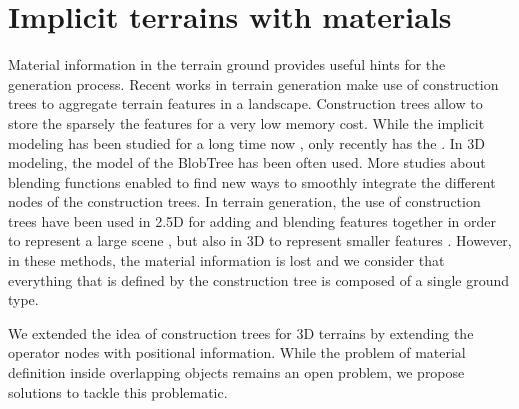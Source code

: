 
\section{Implicit terrains with materials}
\label{sec:volumic-modeling_implicit-terrain-with-materials}

Material information in the terrain ground provides useful hints for the generation process. Recent works in terrain generation make use of construction trees to aggregate terrain features in a landscape. Construction trees allow to store the sparsely the features for a very low memory cost. While the implicit modeling has been studied for a long time now \cite{Turk2001}, only recently has the . In 3D modeling, the model of the BlobTree\cite{Schmidt2006} has been often used. More studies about blending functions \cite{Barthe2004,Bernhardt2010,DeGroot2014,Vaillant2013,Angles2017} enabled to find new ways to smoothly integrate the different nodes of the construction trees. In terrain generation, the use of construction trees have been used in 2.5D for adding and blending features together in order to represent a large scene \cite{Genevaux2015,Guerin2016}, but also in 3D to represent smaller features \cite{Paris2021a}. However, in these methods, the material information is lost and we consider that everything that is defined by the construction tree is composed of a single ground type. 

We extended the idea of construction trees for 3D terrains by extending the operator nodes with positional information. While the problem of material definition inside overlapping objects remains an open problem, we propose solutions to tackle this problematic.


